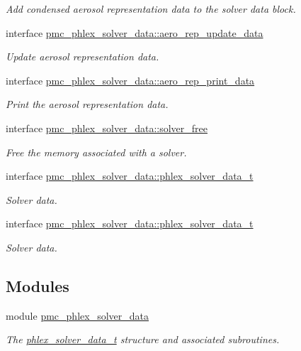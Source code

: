 \begin{DoxyCompactItemize}
\begin{DoxyCompactList}\small\item\em Add condensed aerosol representation data to the solver data block. \end{DoxyCompactList}\item 
interface \mbox{\hyperlink{interfacepmc__phlex__solver__data_1_1aero__rep__update__data}{pmc\+\_\+phlex\+\_\+solver\+\_\+data\+::aero\+\_\+rep\+\_\+update\+\_\+data}}
\begin{DoxyCompactList}\small\item\em Update aerosol representation data. \end{DoxyCompactList}\item 
interface \mbox{\hyperlink{interfacepmc__phlex__solver__data_1_1aero__rep__print__data}{pmc\+\_\+phlex\+\_\+solver\+\_\+data\+::aero\+\_\+rep\+\_\+print\+\_\+data}}
\begin{DoxyCompactList}\small\item\em Print the aerosol representation data. \end{DoxyCompactList}\item 
interface \mbox{\hyperlink{interfacepmc__phlex__solver__data_1_1solver__free}{pmc\+\_\+phlex\+\_\+solver\+\_\+data\+::solver\+\_\+free}}
\begin{DoxyCompactList}\small\item\em Free the memory associated with a solver. \end{DoxyCompactList}\item 
interface \mbox{\hyperlink{structpmc__phlex__solver__data_1_1phlex__solver__data__t}{pmc\+\_\+phlex\+\_\+solver\+\_\+data\+::phlex\+\_\+solver\+\_\+data\+\_\+t}}
\begin{DoxyCompactList}\small\item\em Solver data. \end{DoxyCompactList}\item 
interface \mbox{\hyperlink{structpmc__phlex__solver__data_1_1phlex__solver__data__t}{pmc\+\_\+phlex\+\_\+solver\+\_\+data\+::phlex\+\_\+solver\+\_\+data\+\_\+t}}
\begin{DoxyCompactList}\small\item\em Solver data. \end{DoxyCompactList}\end{DoxyCompactItemize}
\subsection*{Modules}
\begin{DoxyCompactItemize}
\item 
module \mbox{\hyperlink{namespacepmc__phlex__solver__data}{pmc\+\_\+phlex\+\_\+solver\+\_\+data}}
\begin{DoxyCompactList}\small\item\em The \mbox{\hyperlink{structpmc__phlex__solver__data_1_1phlex__solver__data__t}{phlex\+\_\+solver\+\_\+data\+\_\+t}} structure and associated subroutines. \end{DoxyCompactList}\end{DoxyCompactItemize}
